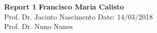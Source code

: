 \documentclass[a4paper, 11pt]{article}
\begin{document}
\noindent
\large\textbf{Report 1} \hfill \textbf{Francisco Maria Calisto} \\
\normalsize
Prof. Dr. Jacinto Nascimento \hfill Date: 14/03/2018 \\
Prof. Dr. Nuno Nunes





\clearpage



\end{document}
